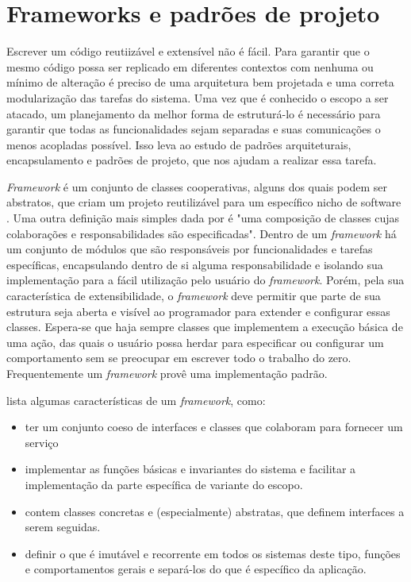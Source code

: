 \section{Frameworks e padrões de projeto}

Escrever um código reutiizável e extensível não é fácil. Para garantir que o mesmo código possa ser replicado em diferentes contextos com nenhuma ou mínimo de alteração é preciso de uma arquitetura bem projetada e uma correta modularização das tarefas do sistema. Uma vez que é conhecido o escopo a ser atacado, um planejamento da melhor forma de estruturá-lo é necessário para garantir que todas as funcionalidades sejam separadas e suas comunicações o menos acopladas possível. Isso leva ao estudo de padrões arquiteturais, encapsulamento e padrões de projeto, que nos ajudam a realizar essa tarefa.

\textit{Framework} é um conjunto de classes cooperativas, alguns dos quais podem ser abstratos, que criam um projeto reutilizável para um específico nicho de software \cite{Szyperski2002}. Uma outra definição mais simples dada por \cite{Fayad1999} é "uma composição de classes cujas colaborações e responsabilidades são especificadas". Dentro de um \textit{framework} há um conjunto de módulos que são responsáveis por funcionalidades e tarefas específicas, encapsulando dentro de si alguma responsabilidade e isolando sua implementação para a fácil utilização pelo usuário do \textit{framework}. Porém, pela sua característica de extensibilidade, o \textit{framework} deve permitir que parte de sua estrutura seja aberta e visível ao programador para extender e configurar essas classes. Espera-se que haja sempre classes que implementem a execução básica de uma ação, das quais o usuário possa herdar para especificar ou configurar um comportamento sem se preocupar em escrever todo o trabalho do zero. Frequentemente um \textit{framework} provê uma implementação padrão.

\cite{Larman2005} lista algumas características de um \textit{framework}, como:
\begin{itemize}
  \item ter um conjunto coeso de interfaces e classes que colaboram para fornecer um serviço
  \item implementar as funções básicas e invariantes do sistema e facilitar a implementação da parte específica de variante do escopo.
  \item contem classes concretas e (especialmente) abstratas, que definem interfaces a serem seguidas.
  \item definir o que é imutável e recorrente em todos os sistemas deste tipo, funções e comportamentos gerais e separá-los do que é específico da aplicação.  
\end{itemize} 

